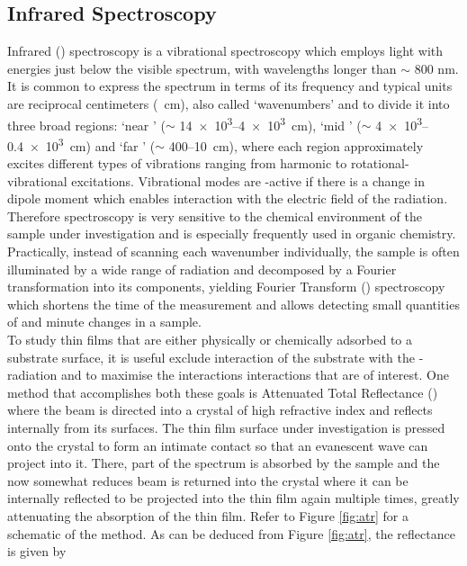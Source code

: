 \subsection{Infrared Spectroscopy}
Infrared (\ir{}) spectroscopy is a vibrational spectroscopy which employs light with energies just below the visible spectrum, \ie{} with wavelengths longer than $\sim$ 800 nm. It is common to express the spectrum in terms of its frequency and typical units are reciprocal centimeters (\si{\per\centi\metre}), also called `wavenumbers' and to divide it into three broad regions: `near \ir{}' ($\sim$ \numrange{14e3}{4e3}\si{\per\centi\metre}), `mid \ir{}' ($\sim$ \numrange{4e3}{0.4e3}\si{\per\centi\metre}) and `far \ir{}' ($\sim$ \numrange{400}{10}\si{\per\centi\metre}), where each region approximately excites different types of vibrations ranging from harmonic to rotational-vibrational excitations. Vibrational modes are \ir{}-active if there is a change in dipole moment which enables interaction with the electric field of the radiation. Therefore \ir{} spectroscopy is very sensitive to the chemical environment of the sample under investigation and is especially frequently used in organic chemistry. Practically, instead of scanning each wavenumber individually, the sample is often illuminated by a wide range of radiation and decomposed by a Fourier transformation into its components, yielding Fourier Transform \ir{} (\ftir{}) spectroscopy which shortens the time of the measurement and allows detecting small quantities of and minute changes in a sample.\\
To study thin films that are either physically or chemically adsorbed to a substrate surface, it is useful exclude interaction of the substrate with the \ir{}-radiation and to maximise the interactions interactions that are of interest. One method that accomplishes  both these goals is Attenuated Total Reflectance (\atr{}) \ftir{} where the \ir{} beam is directed into a crystal of high refractive index and reflects internally from its surfaces. The thin film surface under investigation is pressed onto the crystal to form an intimate contact so that an evanescent \ir{} wave can project into it. There, part of the \ir{} spectrum is absorbed by the sample and the now somewhat reduces beam is returned into the crystal where it can be internally reflected to be projected into the thin film again multiple times, greatly attenuating the absorption of the thin film. Refer to Figure \ref{fig:atr} for a schematic of the \atr{} method. As can be deduced from Figure \ref{fig:atr}, the reflectance is given by
